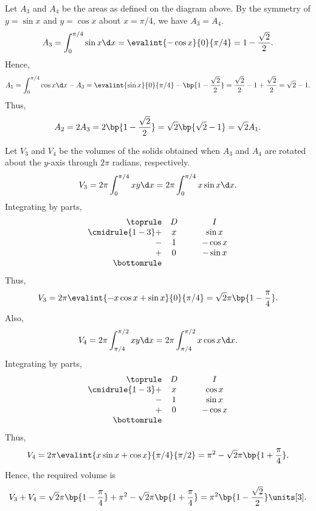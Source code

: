 \begin{solution}
\begin{ppart}
        Let $A_3$ and $A_4$ be the areas as defined on the diagram above. By the symmetry of $y = \sin x$ and $y = \cos x$ about $x = \pi/4$, we have $A_3 = A_4$. \[A_3 = \int_0^{\pi/4} \sin x \d x = \evalint{-\cos x}{0}{\pi/4} = 1 - \frac{\sqrt2}2.\] Hence, \[A_1 = \int_0^{\pi/4} \cos x \d x - A_3 = \evalint{\sin x}{0}{\pi/4} - \bp{1 - \frac{\sqrt2}2} = \frac{\sqrt2}{2} - 1 + \frac{\sqrt2}2 = \sqrt2 - 1.\] Thus, \[A_2 = 2 A_3 = 2\bp{1 - \frac{\sqrt2}2} = \sqrt{2} \bp{\sqrt2 - 1} = \sqrt2 A_1.\]
    \end{ppart}
    \begin{ppart}
        Let $V_3$ and $V_4$ be the volumes of the solids obtained when $A_3$ and $A_4$ are rotated about the $y$-axis through $2\pi$ radians, respectively. \[V_3 = 2\pi\int_0^{\pi/4} xy \d x = 2\pi \int_0^{\pi/4} x\sin x \d x.\] Integrating by parts,
        \[\begin{array}{r c @{\hspace*{1.0cm}} c}\toprule
            & D & I \\\cmidrule{1-3}
            + & x & \sin x \\
            - & 1 & -\cos x\\
            + & 0 & -\sin x \\\bottomrule
        \end{array}\] Thus,
        \[V_3 = 2\pi \evalint{-x\cos x + \sin x}{0}{\pi/4} = \sqrt2 \pi \bp{1 -\frac\pi4}.\] Also, \[V_4 = 2\pi \int_{\pi/4}^{\pi/2} xy \d x = 2\pi \int_{\pi/4}^{\pi/2} x\cos x \d x.\] Integrating by parts, 
        \[\begin{array}{r c @{\hspace*{1.0cm}} c}\toprule
            & D & I \\\cmidrule{1-3}
            + & x & \cos x \\
            - & 1 & \sin x\\
            + & 0 & -\cos x \\\bottomrule
        \end{array}\] Thus, \[V_4 = 2\pi \evalint{x\sin x + \cos x}{\pi/4}{\pi/2} = \pi^2 - \sqrt{2} \pi \bp{1 + \frac\pi4}.\] Hence, the required volume is \[V_3 + V_4 = \sqrt2 \pi \bp{1 - \frac\pi4} + \pi^2 - \sqrt2 \pi \bp{1 + \frac\pi4} = \pi^2 \bp{1 - \frac{\sqrt2}2} \units[3].\]
    \end{ppart}
\end{solution}

